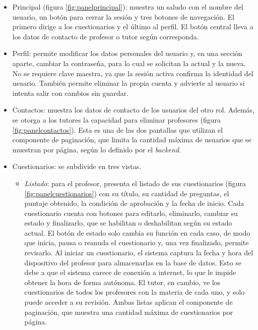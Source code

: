 \begin{itemize}

\item Principal (figura \ref{fig:panelprincipal}): muestra un saludo con el nombre del usuario, un botón para cerrar la sesión y tres botones de navegación. El primero dirige a los cuestionarios y el último al perfil. El botón central lleva a los datos de contacto de profesor o tutor según corresponda.

\item Perfil: permite modificar los datos personales del usuario y, en una sección aparte, cambiar la contraseña, para lo cual se solicitan la actual y la nueva. No se requiere clave maestra, ya que la sesión activa confirma la identidad del usuario. También permite eliminar la propia cuenta y advierte al usuario si intenta salir con cambios sin guardar.

\item Contactos: muestra los datos de contacto de los usuarios del otro rol. Además, se otorga a los tutores la capacidad para eliminar profesores (figura \ref{fig:panelcontactos}). Esta es una de las dos pantallas que utilizan el componente de paginación, que limita la cantidad máxima de usuarios que se muestran por página, según lo definido por el \emph{backend}.

\item Cuestionarios: se subdivide en tres vistas.

\begin{itemize}

\item \emph{Listado}: para el profesor, presenta el listado de sus cuestionarios (figura \ref{fig:panelcuestionarios}) con su título, su cantidad de preguntas, el puntaje obtenido, la condición de aprobación y la fecha de inicio. Cada cuestionario cuenta con botones para editarlo, eliminarlo, cambiar su estado y finalizarlo, que se habilitan o deshabilitan según su estado actual. El botón de estado solo cambia su función en cada caso, de modo que inicia, pausa o reanuda el cuestionario y, una vez finalizado, permite revisarlo. Al iniciar un cuestionario, el sistema captura la fecha y hora del dispositivo del profesor para almacenarlas en la base de datos. Esto se debe a que el sistema carece de conexión a internet, lo que le impide obtener la hora de forma autónoma. El tutor, en cambio, ve los cuestionarios de todos los profesores con la materia de cada uno, y solo puede acceder a su revisión. Ambas listas aplican el componente de paginación, que muestra una cantidad máxima de cuestionarios por página.


\end{itemize}
\end{itemize}

